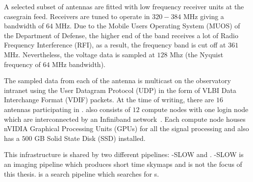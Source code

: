 \par A selected subset of \vla antennas are fitted with low frequency receiver units at the casegrain feed. 
Receivers are tuned to operate in $320-384$ MHz giving a bandwidth of $64$ MHz. Due to the Mobile Users Operating System (MUOS) of the Department of Defense, the higher end of the band receives a lot of Radio Frequency Interference (RFI), as a result, the frequency band is cut off at $361$ MHz. Nevertheless, the voltage data is sampled at $128$ Mhz (the Nyquist frequency of $64$ MHz bandwidth).
\par The sampled data from each of the antenna is multicast on the observatory intranet using the User Datagram Protocol (UDP) in the form of VLBI Data Interchange Format (VDIF) packets. At the time of writing, there are $16$ \vla antennas participating in \vlite. \vlite also consists of $12$ compute nodes with one login node which are interconnected by an Infiniband network~\cite{infiniband}. 
Each compute node houses nVIDIA Graphical Processing Units (GPUs) for all the signal processing and also has a $500$ GB Solid State Disk (SSD) installed.

\par This infrastructure is shared by two different pipelines: \vlite-SLOW and \vf. \vlite-SLOW is an imaging pipeline which produces short time skymaps and is not the focus of this thesis. \vf is a search pipeline which searches for \frb{}s.

